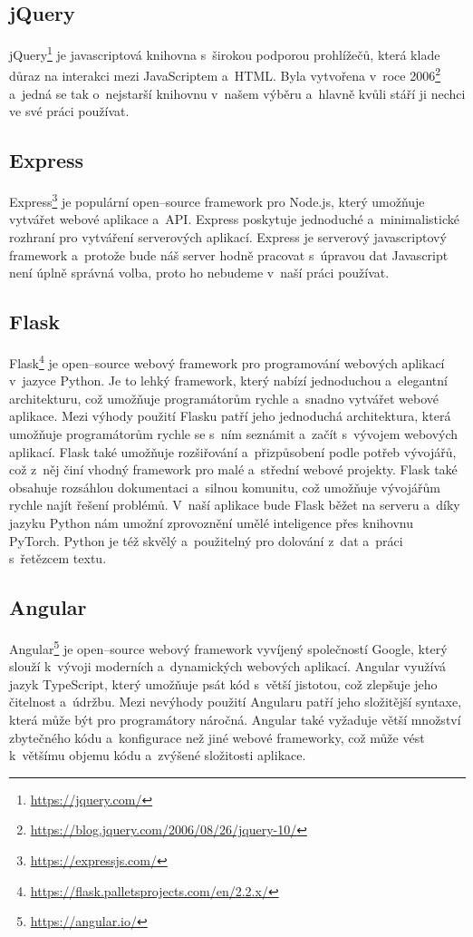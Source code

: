 \subsection{jQuery}
jQuery\footnote{\url{https://jquery.com/}} je javascriptová knihovna s~širokou podporou prohlížečů, která klade důraz na interakci mezi JavaScriptem a~HTML. Byla vytvořena v~roce 2006\footnote{\url{https://blog.jquery.com/2006/08/26/jquery-10/}} a~jedná se tak o~nejstarší knihovnu v~našem výběru a~hlavně kvůli stáří ji nechci ve své práci používat.

\subsection{Express}
Express\footnote{\url{https://expressjs.com/}} je populární open--source framework pro Node.js, který umožňuje vytvářet webové aplikace a~API. Express poskytuje jednoduché a~minimalistické rozhraní pro vytváření serverových aplikací. Express je serverový javascriptový framework a~protože bude náš server hodně pracovat s~úpravou dat Javascript není úplně správná volba, proto ho nebudeme v~naší práci používat.

\subsection{Flask}
Flask\footnote{\url{https://flask.palletsprojects.com/en/2.2.x/}} je open--source webový framework pro programování webových aplikací v~jazyce Python. Je to lehký framework, který nabízí jednoduchou a~elegantní architekturu, což umožňuje programátorům rychle a~snadno vytvářet webové aplikace. 
Mezi výhody použití Flasku patří jeho jednoduchá architektura, která umožňuje programátorům rychle se s~ním seznámit a~začít s~vývojem webových aplikací. Flask také umožňuje rozšiřování a~přizpůsobení podle potřeb vývojářů, což z~něj činí vhodný framework pro malé a~střední webové projekty. Flask také obsahuje rozsáhlou dokumentaci a~silnou komunitu, což umožňuje vývojářům rychle najít řešení problémů. V~naší aplikace bude Flask běžet na serveru a~díky jazyku Python nám umožní zprovoznění umělé inteligence přes knihovnu PyTorch. Python je též skvělý a~použitelný pro dolování z~dat a~práci s~řetězcem textu.

\subsection{Angular}
Angular\footnote{\url{https://angular.io/}} je open--source webový framework vyvíjený společností Google, který slouží k~vývoji moderních a~dynamických webových aplikací. Angular využívá jazyk TypeScript, který umožňuje psát kód s~větší jistotou, což zlepšuje jeho čitelnost a~údržbu.
Mezi nevýhody použití Angularu patří jeho složitější syntaxe, která může být pro programátory náročná. Angular také vyžaduje větší množství zbytečného kódu a~konfigurace než jiné webové frameworky, což může vést k~většímu objemu kódu a~zvýšené složitosti aplikace. 


